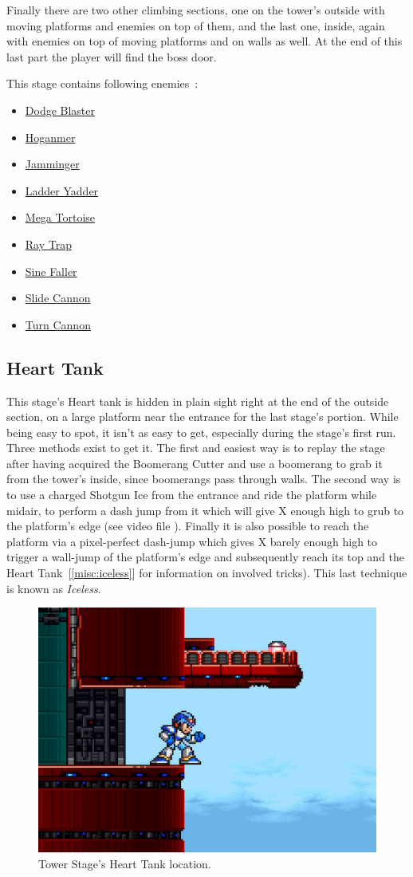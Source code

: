 Finally there are two other climbing sections, one on the tower's outside with moving platforms and enemies on top of them, and the last one, inside, again with enemies on top of moving platforms and on walls as well. At the end of this last part the player will find the boss door.


This stage contains following enemies~\cite{wiki:Tower}:

\begin{itemize}
	\item \hyperlink{enem:Dodge_Blaster}{Dodge Blaster}
	\item \hyperlink{enem:Hoganmer}{Hoganmer}
	\item \hyperlink{enem:Jamminger}{Jamminger}
	\item \hyperlink{enem:Ladder_Yadder}{Ladder Yadder}
	\item \hyperlink{enem:Mega_Tortoise}{Mega Tortoise}
	\item \hyperlink {enem:Ray_Trap}{Ray Trap}
	\item \hyperlink{enem:Sine_Faller}{Sine Faller}
	\item \hyperlink{enem:Slide_Cannon}{Slide Cannon}
	\item \hyperlink{enem:Turn_Cannon}{Turn Cannon}
\end{itemize}

\subsection{Heart Tank}
This stage's Heart tank is hidden in plain sight right at the end of the outside section, on a large platform near the entrance for the last stage's portion. While being easy to spot, it isn't as easy to get, especially during the stage's first run. Three methods exist to get it. The first and easiest way is to replay the stage after having acquired the Boomerang Cutter and use a boomerang to grab it from the tower's inside, since boomerangs pass through walls. The second way is to use a charged Shotgun Ice from the entrance and ride the platform while midair, to perform a dash jump from it which will give X enough high to grub to the platform's edge (see video file ). Finally it is also possible to reach the platform via a pixel-perfect dash-jump which gives X barely enough high to trigger a wall-jump of the platform's edge and subsequently reach its top and the Heart Tank~[\ref{misc:iceless}] for information on involved tricks). This last technique is known as \textit{Iceless}. 
\begin{figure}[htp]
	\centering
	\includegraphics[width=0.4\linewidth]{figures/X1/Boomer_kuwanger/Tower_heart.jpg}
	\caption{Tower Stage's Heart Tank location.}
\end{figure}

